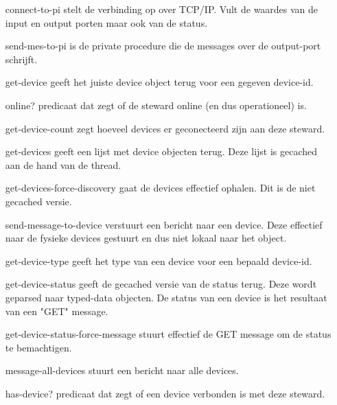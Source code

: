 \documentclass{article}
\begin{document}
\begin{itemize}
  	\item[connect-to-pi] stelt de verbinding op over TCP/IP. Vult de waardes van de input en output porten maar ook van de status. 
  	\item[send-mes-to-pi] is de private procedure die de messages over de output-port schrijft.
  	\item[get-device] geeft het juiste device object terug voor een gegeven device-id.
  	\item[online?] predicaat dat zegt of de steward online (en dus operationeel) is.
  	\item[get-device-count] zegt hoeveel devices er geconecteerd zijn aan deze steward.
  	\item[get-devices] geeft een lijst met device objecten terug. Deze lijst is gecached aan de hand van de thread.
  	\item[get-devices-force-discovery] gaat de devices effectief ophalen. Dit is de niet gecached versie.
  	\item[send-message-to-device] verstuurt een bericht naar een device. Deze effectief naar de fysieke devices gestuurt en dus niet lokaal naar het object.
  	\item[get-device-type] geeft het type van een device voor een bepaald device-id.
  	\item[get-device-status] geeft de gecached versie van de status terug. Deze wordt geparsed naar typed-data objecten. De status van een device is het  resultaat van een "GET" message.
  	\item[get-device-status-force-message] stuurt effectief de GET message om de status te bemachtigen.
  	\item[message-all-devices] stuurt een bericht naar alle devices.
  	\item[has-device?] predicaat dat zegt of een device verbonden is met deze steward.
\end{itemize}
\end{document}
